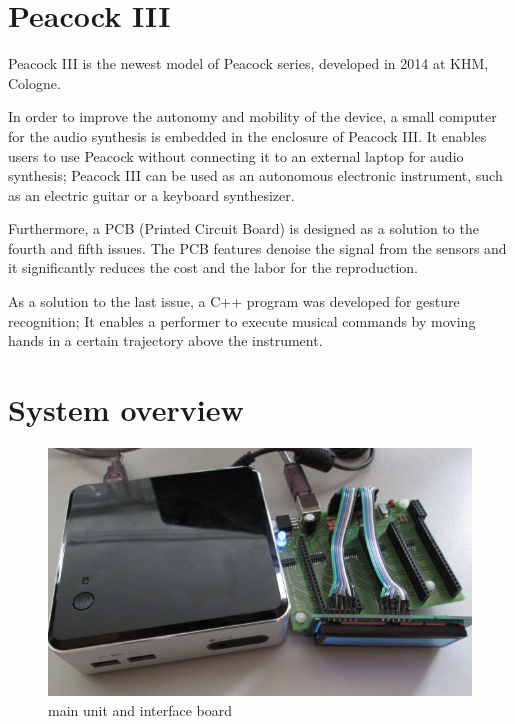 \documentclass{nime-alternate}
\begin{document}
\section{Peacock III}

Peacock III is the newest model of Peacock series, developed in 2014 at KHM, Cologne.

In order to improve the autonomy and mobility of the device, a small computer for the audio synthesis is embedded in the enclosure of Peacock III. It enables users to use Peacock without connecting it to an external laptop for audio synthesis; Peacock III can be used as an autonomous electronic instrument, such as an electric guitar or a keyboard synthesizer. 

Furthermore, a PCB (Printed Circuit Board) is designed as a solution to the fourth and fifth issues. The PCB features denoise the signal from the sensors and it significantly reduces the cost and the labor for the reproduction. 

As a solution to the last issue, a C++ program was developed for gesture recognition; It enables a performer to execute musical commands by moving hands in a certain trajectory above the instrument.

\section{System overview}
\begin{figure}[htbp]
       \begin{center}
              \includegraphics[scale=0.9]{interface_main.jpg}
       \end{center}
       \caption{main unit and interface board}
       \label{fig:interface_main}
\end{figure}
\end{document}
